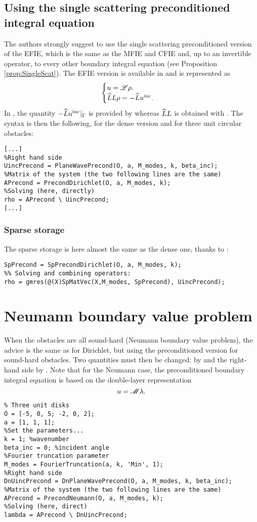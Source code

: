 \subsection{Using the single scattering preconditioned integral equation}
\label{secEx:PrecondD}
The authors strongly suggest to use the single scattering preconditioned version of the EFIE, which is the same as the MFIE and CFIE and, up to an invertible operator, to every other boundary integral equation (see Proposition \ref{prop:SingleScat}). The EFIE version is available in \mudiff and is represented as
$$
\begin{cases}
u = {\mathscr L}\rho.\\
\widehat{L} L \rho = -\widehat{L}u^{\textrm{inc}}.
\end{cases}
$$
In \mudiff, the quantity $-\widehat{L}u^{\textrm{inc}}|_{\Gamma}$ is provided by \PlaneWavePrecond whereas $\widehat{L} L$ is obtained with \PrecondDirichlet. The syntax is then the following, for the dense version and for three unit circular obstacles:
\begin{lstlisting}
[...]
%Right hand side
UincPrecond = PlaneWavePrecond(O, a, M_modes, k, beta_inc);
%Matrix of the system (the two following lines are the same)
APrecond = PrecondDirichlet(O, a, M_modes, k);
%Solving (here, directly)
rho = APrecond \ UincPrecond;
[...]
\end{lstlisting}


\subsubsection{Sparse storage}

The sparse storage is here almost the same as the dense one, thanks to \SpPrecondDirichlet:
\begin{lstlisting}
SpPrecond = SpPrecondDirichlet(O, a, M_modes, k);
%% Solving and combining operators:
rho = gmres(@(X)SpMatVec(X,M_modes, SpPrecond), UincPrecond);
\end{lstlisting}


\section{Neumann boundary value problem}

When the obstacles are all sound-hard (Neumann boundary value problem), the advice is the same as for Dirichlet, but using the preconditioned version for sound-hard obstacles. Two quantities must then be changed: \PrecondDirichlet by \PrecondNeumann and the right-hand side \PlaneWavePrecond by \DnPlaneWavePrecond. Note that for the Neumann case, the preconditioned boundary integral equation is based on the double-layer representation
$$
u = {\mathscr M}\lambda.
$$
\begin{lstlisting}
% Three unit disks 
O = [-5, 0, 5; -2, 0, 2];
a = [1, 1, 1];
%Set the parameters...
k = 1; %wavenumber
beta_inc = 0; %incident angle
%Fourier truncation parameter
M_modes = FourierTruncation(a, k, 'Min', 1);
%Right hand side
DnUincPrecond = DnPlaneWavePrecond(O, a, M_modes, k, beta_inc);
%Matrix of the system (the two following lines are the same)
APrecond = PrecondNeumann(O, a, M_modes, k);
%Solving (here, direct)
lambda = APrecond \ DnUincPrecond;
\end{lstlisting}

